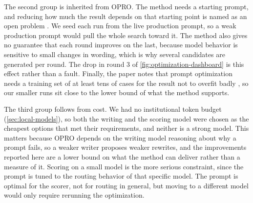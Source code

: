 The second group is inherited from OPRO. The method needs a starting prompt, and reducing how much the result depends on that starting point is named as an open problem \autocite{yang2023llmoptimizers}. We seed each run from the live production prompt, so a weak production prompt would pull the whole search toward it. The method also gives no guarantee that each round improves on the last, because model behavior is sensitive to small changes in wording, which is why several candidates are generated per round. The drop in round 3 of \cref{fig:optimization-dashboard} is this effect rather than a fault. Finally, the paper notes that prompt optimization needs a training set of at least tens of cases for the result not to overfit badly \autocite{yang2023llmoptimizers}, so our smaller runs sit close to the lower bound of what the method supports.

The third group follows from cost. We had no institutional token budget (\cref{sec:local-models}), so both the writing and the scoring model were chosen as the cheapest options that met their requirements, and neither is a strong model. This matters because OPRO depends on the writing model reasoning about why a prompt fails, so a weaker writer proposes weaker rewrites, and the improvements reported here are a lower bound on what the method can deliver rather than a measure of it. Scoring on a small model is the more serious constraint, since the prompt is tuned to the routing behavior of that specific model. The prompt is optimal for the scorer, not for routing in general, but moving to a different model would only require rerunning the optimization.
